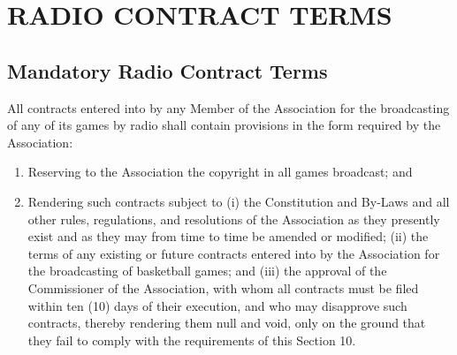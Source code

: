 \documentclass[]{book}
\theoremstyle{definition}
\theoremstyle{definition}
\theoremstyle{definition}
\theoremstyle{remark}
\begin{document}
\section{RADIO CONTRACT TERMS}\label{radio-contract-terms}

\subsection{Mandatory Radio Contract
Terms}\label{mandatory-radio-contract-terms}

All contracts entered into by any Member of the Association for the
broadcasting of any of its games by radio shall contain provisions in
the form required by the Association:

\begin{enumerate}
\def\labelenumi{(\alph{enumi})}
\item
  Reserving to the Association the copyright in all games broadcast; and
\item
  Rendering such contracts subject to (i) the Constitution and By-Laws
  and all other rules, regulations, and resolutions of the Association
  as they presently exist and as they may from time to time be amended
  or modified; (ii) the terms of any existing or future contracts
  entered into by the Association for the broadcasting of basketball
  games; and (iii) the approval of the Commissioner of the Association,
  with whom all contracts must be filed within ten (10) days of their
  execution, and who may disapprove such contracts, thereby rendering
  them null and void, only on the ground that they fail to comply with
  the requirements of this Section 10.
\end{enumerate}
\end{document}
